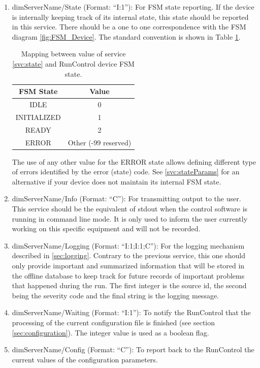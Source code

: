 \documentclass[a4paper]{article}
\begin{document}
\begin{enumerate}[label=\textbf{SVC.\arabic*}]
	\item \label{svc:state} dimServerName/State (Format: ``I:1''): For FSM state
	reporting. If the device is internally keeping track of its internal state, this state should be reported in this service. There should
	be a one to one correspondence with the FSM diagram \ref{fig:FSM_Device}. The standard convention
	is shown in Table \ref{table:FSMStates}.
	\begin{table}
		\center
		\begin{tabular}{c|c}
			FSM State & Value\\
			\hline
			IDLE & 0\\
			INITIALIZED & 1\\
			READY & 2\\
			ERROR & Other (-99 reserved)\\
			\hline
		\end{tabular}
		\caption{Mapping between value of service \ref{svc:state} and RunControl device FSM state.}
		\label{table:FSMStates}
	\end{table}
	The use of any other value for the ERROR state allows defining different type of errors identified
	by the error (state) code. See \ref{svc:stateParams} for an alternative if your device does not
	maintain its internal FSM state.
	\item \label{svc:info} dimServerName/Info (Format: ``C''): For transmitting output to the user. This
	service should be the equivalent of stdout when the control software is running in command line
	mode. It is only used to inform the user currently working on this specific equipment and will not
	be recorded.
	\item \label{svc:logging} dimServerName/Logging (Format: ``I:1;I:1;C''): For the logging mechanism
	described in \ref{sec:logging}. Contrary to the previous service, this one should only provide important and
	summarized information that will be stored in the offline database to keep track for future records
	of important problems that happened during the run. The first integer is the
	source id, the second being the severity code and the final string is the
	logging message.
	\item \label{svc:waiting} dimServerName/Waiting (Format: ``I:1''): To notify
	the RunControl that the processing of the current configuration file is
	finished (see section \ref{sec:configuration}). The integer value is used as a
	boolean flag.
	\item \label{svc:config} dimServerName/Config (Format: ``C''): To report back to the RunControl the
	current values of the configuration parameters.
\end{enumerate}
\end{document}

